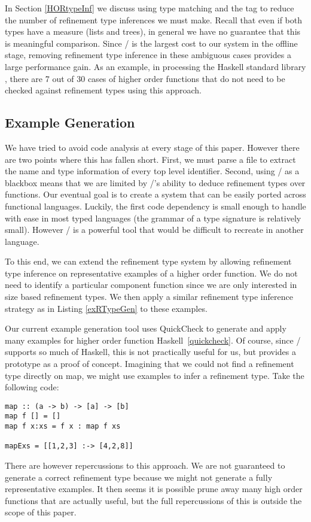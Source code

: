 In Section \ref{HORtypeInf} we discuss using type matching and the  tag to reduce the number of refinement type inferences we must make. Recall that even if both types have a measure (lists and trees), in general we have no guarantee that this is meaningful comparison. Since \lhask/ is the largest cost to our system in the offline stage, removing refinement type inference in these ambiguous cases provides a large performance gain. As an example, in processing the Haskell standard library , there are 7 out of 30 cases of higher order functions that do not need to be checked against refinement types using this approach.


\subsection{Example Generation}\label{languageSupport}

We have tried to avoid code analysis at every stage of this paper.
However there are two points where this has fallen short. 
First, we must parse a file to extract the name and type information of every top level identifier. 
Second, using \lhask/ as a blackbox means that we are limited by \lhask/'s ability to deduce refinement types over functions. 
Our eventual goal is to create a system that can be easily ported across functional languages. 
Luckily, the first code dependency is small enough to handle with ease in most typed languages (the grammar of a type signature is relatively small). However \lhask/ is a powerful tool that would be difficult to recreate in another language. 

To this end, we can extend the refinement type system by allowing refinement type inference on representative examples of a higher order function.
We do not need to identify a particular component function since we are only interested in size based refinement types.
We then apply a similar refinement type inference strategy as in Listing \ref{exRTypeGen} to these examples.

Our current example generation tool uses QuickCheck to generate and apply many examples for higher order function Haskell~\ref{quickcheck}.
Of course, since \lhask/ supports so much of Haskell, this is not practically useful for us, but provides a prototype as a proof of concept.
Imagining that we could not find a refinement type directly on map, we might use examples to infer a refinement type. Take the following code:

\begin{lstlisting}[numbers=none]
map :: (a -> b) -> [a] -> [b]
map f [] = [] 
map f x:xs = f x : map f xs

mapExs = [[1,2,3] :-> [4,2,8]]
\end{lstlisting}

There are however repercussions to this approach. We are not guaranteed to generate a correct refinement type because we might not generate a fully representative examples. It then seems it is possible prune away many high order functions that are actually useful, but the full repercussions of this is outside the scope of this paper.


